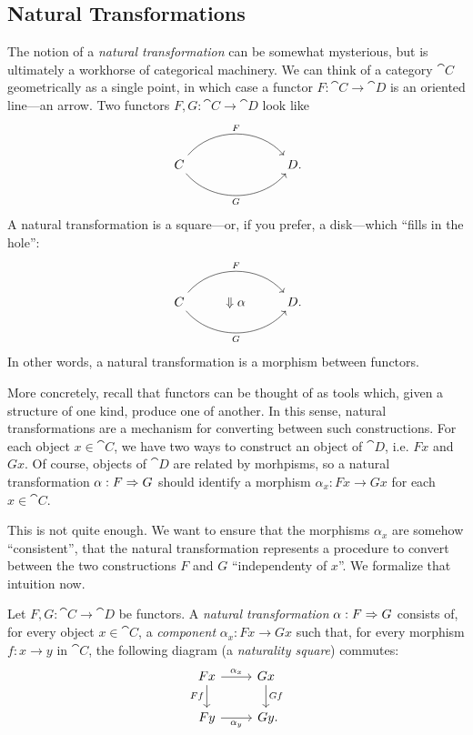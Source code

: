 \subsection{Natural Transformations}

The notion of a \emph{natural transformation} can be somewhat mysterious, but is
ultimately a workhorse of categorical machinery. We can think of a category
$\cat{C}$ geometrically as a single point, in which case a functor $F:
\cat{C}\to\cat{D}$ is an oriented line---an arrow. Two functors $F,G:
\cat{C}\to\cat{D}$ look like \[
  \begin{tikzcd}
    C \ar[rr, "F", bend left=50]\ar[rr, "G"', bend right=50] & \phantom{\Downarrow\alpha} & D\punctuation{.}
  \end{tikzcd}
\]
A natural transformation is a square---or, if you prefer, a disk---which ``fills
in the hole'': \[
  \begin{tikzcd}
    C \ar[rr, "F", bend left=50]\ar[rr, "G"', bend right=50] & \Downarrow\alpha& D\punctuation{.}
  \end{tikzcd}
\]
In other words, a natural transformation is a morphism between functors.

More concretely, recall that functors can be thought of as tools which, given a
structure of one kind, produce one of another. In this sense, natural
transformations are a mechanism for converting between such constructions. For
each object $x\in\cat{C}$, we have two ways to construct an object of $\cat{D}$,
i.e. $Fx$ and $Gx$. Of course, objects of $\cat{D}$ are related by morhpisms, so
a natural transformation $\alpha: F\Rightarrow G$ should identify a morphism $\alpha_x:
Fx\to Gx$ for each $x\in\cat{C}$.

This is not quite enough. We want to ensure that the morphisms $\alpha_x$ are
somehow ``consistent'', that the natural transformation represents a procedure to
convert between the two constructions $F$ and $G$ ``independenty of $x$''. We
formalize that intuition now.

\begin{dfn}\label{def:natural transformation}
  Let $F, G: \cat{C}\to\cat{D}$ be functors. A \emph{natural transformation}
  $\alpha: F\Rightarrow G$ consists of, for every object $x\in\cat{C}$, a
  \emph{component} $\alpha_x: Fx\to Gx$ such that, for every morphism $f: x\to
  y$ in $\cat{C}$, the following diagram (a \emph{naturality square}) commutes:
  \[
    \begin{tikzcd}
      Fx\ar[r, "\alpha_x"]\ar[d, "Ff"'] & Gx\ar[d, "Gf"] \\
      Fy\ar[r, "\alpha_y"'] & Gy\punctuation{.}
    \end{tikzcd}
  \]
\end{dfn}

